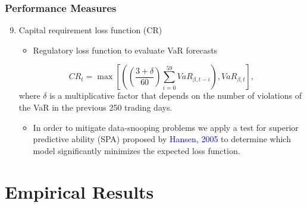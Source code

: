\documentclass[pdf,9pt,xcolor=dvipsnames,hide notes]{beamer}
\begin{document}
\begin{frame}
\frametitle{Performance Measures}

\begin{enumerate}
	\setcounter{enumi}{8}
	
	\item Capital requirement loss function (CR)
	
	\begin{itemize}
		\item 	Regulatory loss function to evaluate VaR forecasts
	\end{itemize}
	
	\begin{equation}CR_{t} =\max \left [\left (\genfrac{(}{)}{}{}{3 +\delta }{60}\sum _{i =0}^{59}VaR_{\beta  ,t -i}\right ) ,VaR_{\beta  ,t}\right ] ,
	\end{equation}where $\delta $ is a multiplicative factor that depends on the number of violations of the VaR in the previous 250 trading days.
	
	\vspace{0.3cm}
	
		\begin{itemize}
		\item 	In order to mitigate data-snooping problems we apply a test for superior predictive ability (SPA) proposed by \textcolor{blue}{Hansen}, \textcolor{blue}{2005} to determine which model significantly minimizes the expected loss function. 
	\end{itemize}
	
	
\end{enumerate}



\end{frame}

\section{Empirical Results}
\end{document}
